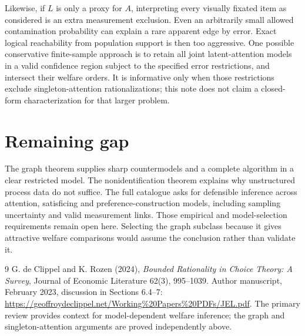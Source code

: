 \documentclass[11pt,a4paper]{article}
\begin{document}
Likewise, if $L$ is only a proxy for $A$, interpreting every visually fixated item as considered is an extra measurement exclusion. Even an arbitrarily small allowed contamination probability can explain a rare apparent edge by error. Exact logical reachability from population support is then too aggressive. One possible conservative finite-sample approach is to retain all joint latent-attention models in a valid confidence region subject to the specified error restrictions, and intersect their welfare orders. It is informative only when those restrictions exclude singleton-attention rationalizations; this note does not claim a closed-form characterization for that larger problem.

\section{Remaining gap}
The graph theorem supplies sharp countermodels and a complete algorithm in a clear restricted model. The nonidentification theorem explains why unstructured process data do not suffice. The full catalogue asks for defensible inference across attention, satisficing and preference-construction models, including sampling uncertainty and valid measurement links. Those empirical and model-selection requirements remain open here. Selecting the graph subclass because it gives attractive welfare comparisons would assume the conclusion rather than validate it.

\begin{thebibliography}{9}
 G. de Clippel and K. Rozen (2024), \emph{Bounded Rationality in Choice Theory: A Survey}, Journal of Economic Literature 62(3), 995--1039. Author manuscript, February 2023, discussion in Sections 6.4--7: \url{https://geoffroydeclippel.net/Working%20Papers%20PDFs/JEL.pdf}. The primary review provides context for model-dependent welfare inference; the graph and singleton-attention arguments are proved independently above.
\end{thebibliography}
\end{document}
